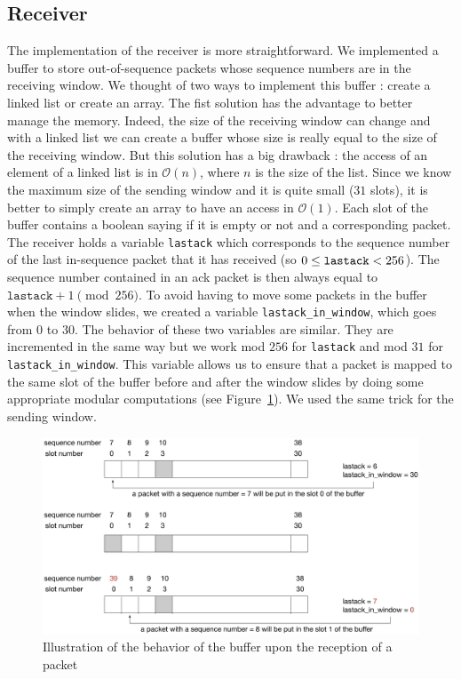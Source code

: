 \documentclass[10pt,a4paper]{article}
\begin{document}
\subsection{Receiver}
The implementation of the receiver is more straightforward. We implemented a buffer to store out-of-sequence packets whose sequence numbers are in the receiving window. We thought of two ways to implement this buffer : create a linked list or create an array. The fist solution has the advantage to better manage the memory. Indeed, the size of the receiving window can change and with a linked list we can create a buffer whose size is really equal to the size of the receiving window. But this solution has a big drawback : the access of an element of a linked list is in $\mathcal{O}(n)$, where $n$ is the size of the list. Since we know the maximum size of the sending window and it is quite small ($31$ slots), it is better to simply create an array to have an access in $\mathcal{O}(1)$. Each slot of the buffer contains a boolean saying if it is empty or not and a corresponding packet. The receiver holds a variable \texttt{lastack} which corresponds to the sequence number of the last in-sequence packet that it has received (so $0 \leq \text{\texttt{lastack}} < 256$). The sequence number contained in an ack packet is then always equal to $\texttt{lastack} + 1 \pmod{256}$. To avoid having to move some packets in the buffer when the window slides, we created a variable \texttt{lastack\_in\_window}, which goes from $0$ to $30$. The behavior of these two variables are similar. They are incremented in the same way but we work mod $256$ for \texttt{lastack} and mod $31$ for \texttt{lastack\_in\_window}. This variable allows us to ensure that a packet is mapped to the same slot of the buffer before and after the window slides by doing some appropriate modular computations (see Figure~\ref{buffer}).  We used the same trick for the sending window.

\begin{figure}[!h]
	\begin{center}
		\includegraphics[width=15cm]{images/buffer.eps}
		\caption{Illustration of the behavior of the buffer upon the reception of a packet}
		\label{buffer}
	\end{center}
\end{figure}
\end{document}
